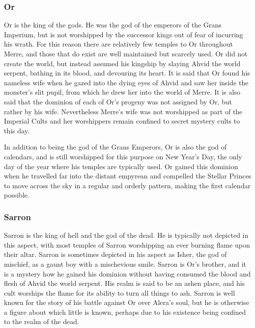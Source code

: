 \documentclass[paper=a4, fontsize=11pt]{scrartcl} %
\begin{document}
\begin{multicols}{2}
\subsubsection{Or}

Or is the king of the gods. He was the god of the emperors of the Grans Imperium, but is not worshipped by the successor kings out of fear of incurring his wrath. For this reason there are relatively few temples to Or throughout Merre, and those that do exist are well maintained but scarcely used. Or did not create the world, but instead assumed his kingship by slaying Ahvid the world serpent, bathing in its blood, and devouring its heart. It is said that Or found his nameless wife when he gazed into the dying eyes of Ahvid and saw her inside the monster's slit pupil, from which he drew her into the world of Merre. It is also said that the dominion of each of Or's progeny was not assigned by Or, but rather by his wife. Nevertheless Merre's wife was not worshipped as part of the Imperial Cults and her worshippers remain confined to secret mystery cults to this day. 

In addition to being the god of the Grans Emperors, Or is also the god of calendars, and is still worshipped for this purpose on New Year's Day, the only day of the year where his temples are typically used. Or gained this dominion when he travelled far into the distant empyrean and compelled the Stellar Princes to move across the sky in a regular and orderly pattern, making the first calendar possible.

\subsubsection{Sarron}

Sarron is the king of hell and the god of the dead. He is typically not depicted in this aspect, with most temples of Sarron worshipping an ever burning flame upon their altar. Sarron is sometimes depicted in his aspect as Isher, the god of mischief, as a gaunt boy with a mischevious smile. Sarron is Or's brother, and it is a mystery how he gained his dominion without having consumed the blood and flesh of Ahvid the world serpent. His realm is said to be an ashen place, and his cult worships the flame for its ability to turn all things to ash. Sarron is well known for the story of his battle against Or over Alera's soul, but he is otherwise a figure about which little is known, perhaps due to his existence being confined to the realm of the dead.


\end{multicols}
\end{document}
